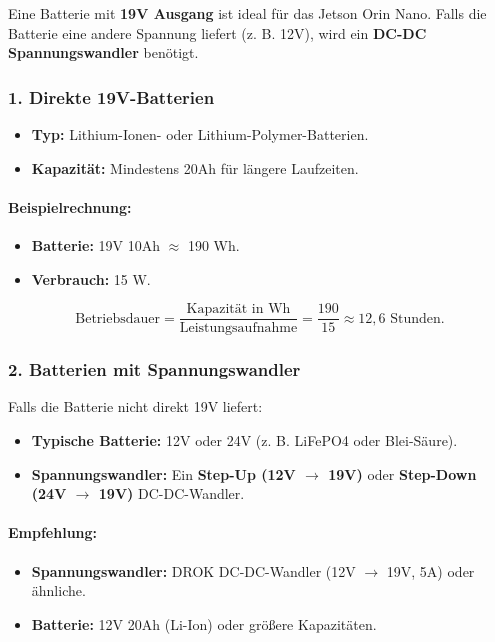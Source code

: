 \documentclass[a4paper,12pt]{article}
\begin{document}
Eine Batterie mit \textbf{19V Ausgang} ist ideal für das Jetson Orin Nano. Falls die Batterie eine andere Spannung liefert (z. B. 12V), wird ein \textbf{DC-DC Spannungswandler} benötigt.

\subsubsection*{1. Direkte 19V-Batterien}
\begin{itemize}
    \item \textbf{Typ:} Lithium-Ionen- oder Lithium-Polymer-Batterien.
    \item \textbf{Kapazität:} Mindestens 20Ah für längere Laufzeiten.
\end{itemize}

\paragraph{Beispielrechnung:}
\begin{itemize}
    \item \textbf{Batterie:} 19V 10Ah $\approx$ 190 Wh.
    \item \textbf{Verbrauch:} 15 W.
\end{itemize}
\[
    \text{Betriebsdauer} = \frac{\text{Kapazität in Wh}}{\text{Leistungsaufnahme}} = \frac{190}{15} \approx 12,6 \text{ Stunden.}
\]

\subsubsection*{2. Batterien mit Spannungswandler}
Falls die Batterie nicht direkt 19V liefert:
\begin{itemize}
    \item \textbf{Typische Batterie:} 12V oder 24V (z. B. LiFePO4 oder Blei-Säure).
    \item \textbf{Spannungswandler:} Ein \textbf{Step-Up (12V $\to$ 19V)} oder \textbf{Step-Down (24V $\to$ 19V)} DC-DC-Wandler.
\end{itemize}

\paragraph{Empfehlung:}
\begin{itemize}
    \item \textbf{Spannungswandler:} DROK DC-DC-Wandler (12V $\to$ 19V, 5A) oder ähnliche.
    \item \textbf{Batterie:} 12V 20Ah (Li-Ion) oder größere Kapazitäten.
\end{itemize}
\end{document}
